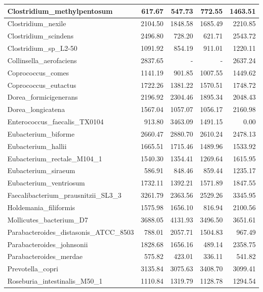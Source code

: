 \documentclass[12pt,a4paper]{article}
\begin{document}
\begin{table}[ht]
\begin{center}
\begin{tabular}{|l*{4}{|r}|}
Clostridium\_methylpentosum & 617.67 & 547.73 & 772.55 & 1463.51 \\ \hline
Clostridium\_nexile & 2104.50 & 1848.58 & 1685.49 & 2210.85 \\ \hline
Clostridium\_scindens & 2496.80 & 728.20 & 621.71 & 2543.72 \\ \hline
Clostridium\_sp\_L2-50 & 1091.92 & 854.19 & 911.01 & 1220.11 \\ \hline
Collinsella\_aerofaciens & 2837.65 & - & - & 2637.24 \\ \hline
Coprococcus\_comes & 1141.19 & 901.85 & 1007.55 & 1449.62 \\ \hline
Coprococcus\_eutactus & 1722.26 & 1381.22 & 1570.51 & 1748.72 \\ \hline
Dorea\_formicigenerans & 2196.92 & 2304.46 & 1895.34 & 2048.43 \\ \hline
Dorea\_longicatena & 1567.04 & 1057.07 & 1056.17 & 2160.98 \\ \hline
Enterococcus\_faecalis\_TX0104 & 913.80 & 3463.09 & 1491.15 & 0.00 \\ \hline
Eubacterium\_biforme & 2660.47 & 2880.70 & 2610.24 & 2478.13 \\ \hline
Eubacterium\_hallii & 1665.51 & 1715.46 & 1489.96 & 1533.92 \\ \hline
Eubacterium\_rectale\_M104\_1 & 1540.30 & 1354.41 & 1269.64 & 1615.95 \\ \hline
Eubacterium\_siraeum & 586.91 & 848.46 & 859.44 & 1235.17 \\ \hline
Eubacterium\_ventriosum & 1732.11 & 1392.21 & 1571.89 & 1847.55 \\ \hline
Faecalibacterium\_prausnitzii\_SL3\_3 & 3261.79 & 2363.56 & 2529.26 & 3345.95 \\ \hline
Holdemania\_filiformis & 1575.98 & 1656.10 & 816.94 & 2100.56 \\ \hline
Mollicutes\_bacterium\_D7 & 3688.05 & 4131.93 & 3496.50 & 3651.61 \\ \hline
Parabacteroides\_distasonis\_ATCC\_8503 & 788.01 & 2057.71 & 1504.83 & 967.49 \\ \hline
Parabacteroides\_johnsonii & 1828.68 & 1656.16 & 489.14 & 2358.75 \\ \hline
Parabacteroides\_merdae & 575.82 & 423.01 & 336.11 & 541.82 \\ \hline
Prevotella\_copri & 3135.84 & 3075.63 & 3408.70 & 3099.41 \\ \hline
Roseburia\_intestinalis\_M50\_1 & 1110.84 & 1319.79 & 1128.78 & 1294.54 \\ \hline

\end{tabular}
\end{center}
\end{table}
\end{document}
